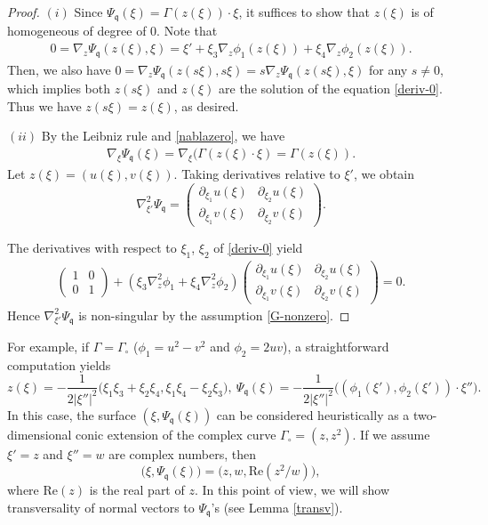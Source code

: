 \documentclass[10pt] %
{amsart}
\theoremstyle{plain}
\numberwithin{equation}{section}
\newcommand{\fq}{\mathfrak q}
\begin{document}
\begin{proof}
$(i)$ Since $\Psi_\fq (\xi) = \Gamma(z(\xi))\cdot \xi$, it suffices to show that $z(\xi)$ is of homogeneous of degree of $0$. 
Note that
\begin{align}\label{deriv-0}
0=\nabla_z \Psi_{\fq}(z(\xi),\xi) 
=\xi' + \xi_3 \nabla_z \phi_1(z(\xi)) + \xi_4 \nabla_z \phi_2(z(\xi)).
\end{align}
Then, we also have  $0=\nabla_z\Psi_{\mathfrak q}(z(s\xi),s\xi) = s\nabla_z\Psi_{\mathfrak q}(z(s\xi),\xi)$ for any $s\neq0$, which implies
 both $z(s\xi)$ and $z(\xi)$ are the solution of the equation \eqref{deriv-0}. 
Thus we have $z(s\xi)=z(\xi)$, as desired. 

$(ii)$ By the Leibniz rule and \eqref{nablazero}, we have
\begin{align}\label{grad1}
\nabla_{\xi}\Psi_\fq (\xi)=\nabla_\xi ( \Gamma(z(\xi) \cdot \xi )= \Gamma(z(\xi)). 
\end{align}
Let $z(\xi) = (u(\xi),v(\xi))$. Taking derivatives relative to $\xi'$, we obtain
\[
\nabla_{\xi'}^2 \Psi_\fq = \begin{pmatrix} 	\partial_{\xi_1} u(\xi) & \partial_{\xi_2} u(\xi) \\
	\partial_{\xi_1} v(\xi) & \partial_{\xi_2} v(\xi) 
 \end{pmatrix} .
\]

The derivatives with respect to $\xi_1$, $\xi_2$ of \eqref{deriv-0} yield
\begin{align*} 
\begin{pmatrix} 1 & 0  \\ 0 & 1
\end{pmatrix} +
\left(\xi_3 \nabla_{z}^2 \phi_1 + \xi_4  \nabla_{z}^2 \phi_2 \right) \begin{pmatrix} 	\partial_{\xi_1} u(\xi) & \partial_{\xi_2} u(\xi) \\
	\partial_{\xi_1} v(\xi) & \partial_{\xi_2} v(\xi) 
 \end{pmatrix} = 0.
\end{align*}
Hence $\nabla_{\xi'}^2 \Psi_\fq$ is non-singular by the assumption \eqref{G-nonzero}. \end{proof}


For example,  
if $\Gamma = \Gamma_\circ$ ($\phi_1 = u^2-v^2$ and $\phi_2=2uv$), a straightforward computation yields
\[
z(\xi ) =-\frac{1}{2|\xi''|^2 }\big(   \xi_1 \xi_3 + \xi_2 \xi_4 ,   \xi_1 \xi_4 - \xi_2 \xi_3   \big), ~
\Psi_\fq(\xi)=-\frac{1}{2|\xi''|^2 }\big( (\phi_1(\xi'),\phi_2(\xi')) \cdot \xi'' \big).
\] 
In this case, the surface $(\xi,\Psi_\fq(\xi))$ can be considered heuristically as a  two-dimensional conic extension of the complex curve $\Gamma_\circ=(z, z^2)$. 
If we assume $\xi'=z$ and $\xi''=w$ are complex numbers, then 
\[
\big( \xi,  \Psi_\fq(\xi) \big) = \big(z,w, \mathrm{Re}( z^2/w) \big),
\]
where $\mathrm{Re}(z)$ is the real part of $z$. 
In this point of view, we will show transversality of normal vectors to $\Psi_\fq$'s (see Lemma \ref{transv}). 
\end{document}
